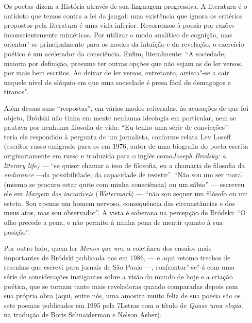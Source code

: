 {{{Os poetas dizem a História através de sua linguagem progressiva. A
literatura é o antídoto que temos contra a lei da jangal: uma existência
que ignora os critérios propostos pela literatura é uma vida inferior.
Recorremos à poesia por razões inconscientemente miméticas. Por utilizar
o modo analítico de cognição, mas orientar"-se principalmente para os
modos da intuição e da revelação, o exercício poético é um acelerador da
consciência. Enfim, literalmente: ``A sociedade, maioria por definição,
presume ter outras opções que não sejam as de ler versos, por mais bem
escritos. Ao deixar de ler versos, entretanto, arrisca"-se a cair naquele
nível de elóquio em que uma sociedade é presa fácil de demagogos e
tiranos''.

Além dessas suas ``respostas'', em vários modos reiteradas, às
acusações de que foi objeto, Bródski não tinha em mente nenhuma
ideologia em particular, nem se pautava por nenhuma filosofia de vida:
``Eu tenho uma série de convicções'' --- teria ele respondido à
pergunta de um jornalista, conforme relata Lev Loseff (escritor russo emigrado
para os  em 1976, autor de uma biografia do poeta escrita
originariamente em russo e traduzida para o inglês como\emph{Joseph
Brodsky: a literary life)} --- ``se quiser
chamar a isso de filosofia, eu a chamaria de filosofia da
\emph{endurance} ---da possibilidade, da capacidade de resistir''.
``Não sou um ser moral (mesmo se procuro estar quite com minha
consciência) ou um sábio'' --- escreveu ele em \emph{Margem dos
incuráveis} (\emph{Watermark}) --- ``não sou sequer um filósofo ou um
esteta. Sou apenas um homem nervoso, consequência das circunstâncias e
dos meus atos, mas sou observador''. A vista é soberana na percepção de
Bródski: ``O olho precede a pena, e não permito à minha pena de mentir
quanto à sua posição''.

Por outro lado, quem ler \emph{Menos que um}, a coletânea dos ensaios
mais importantes de Bródski publicada nos  em 1986, --- e aqui
retomo trechos de resenhas que escrevi para jornais de São Paulo ---,
confrontar"-se"-á com uma série de considerações instigantes sobre a visão
do mundo de hoje e a criação poética, que se tornam tanto mais
reveladoras quando comparadas depois com sua própria obra (aqui, entre
nós, uma amostra muito feliz de sua poesia são os sete poemas publicados
em 1995 pela 7Letras com o título de \emph{Quase uma elegia}, na
tradução de Boris Schnaiderman e Nelson Asher).

}}}
